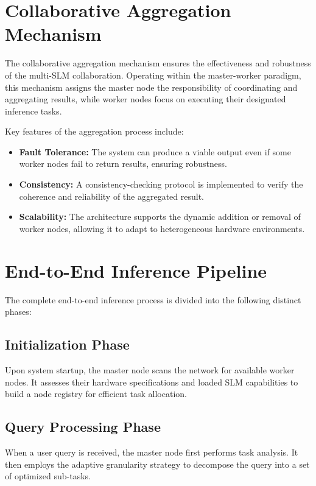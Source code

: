 \section{Collaborative Aggregation Mechanism}

The collaborative aggregation mechanism ensures the effectiveness and robustness of the multi-SLM collaboration. Operating within the master-worker paradigm, this mechanism assigns the master node the responsibility of coordinating and aggregating results, while worker nodes focus on executing their designated inference tasks.

Key features of the aggregation process include:

\begin{itemize}
    \item \textbf{Fault Tolerance:} The system can produce a viable output even if some worker nodes fail to return results, ensuring robustness.
    \item \textbf{Consistency:} A consistency-checking protocol is implemented to verify the coherence and reliability of the aggregated result.
    \item \textbf{Scalability:} The architecture supports the dynamic addition or removal of worker nodes, allowing it to adapt to heterogeneous hardware environments.
\end{itemize}

\section{End-to-End Inference Pipeline}

The complete end-to-end inference process is divided into the following distinct phases:

\subsection{Initialization Phase}
Upon system startup, the master node scans the network for available worker nodes. It assesses their hardware specifications and loaded SLM capabilities to build a node registry for efficient task allocation.

\subsection{Query Processing Phase}
When a user query is received, the master node first performs task analysis. It then employs the adaptive granularity strategy to decompose the query into a set of optimized sub-tasks.

